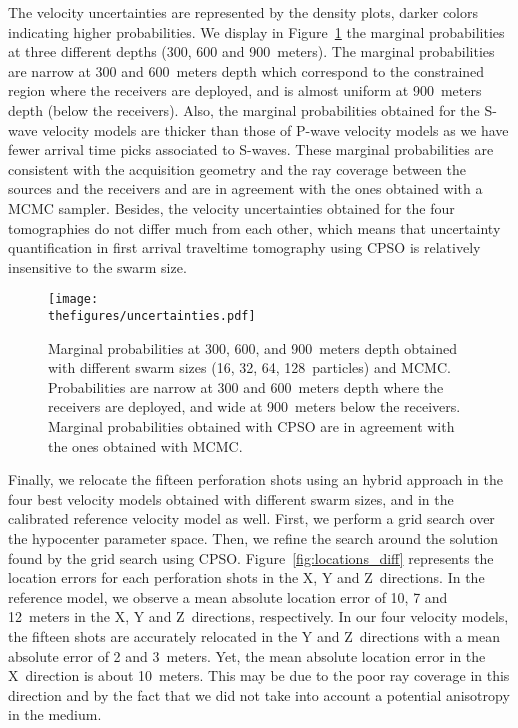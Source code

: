 The velocity uncertainties are represented by the density plots, darker colors indicating higher probabilities. We display in Figure~\ref{fig:uncertainties} the marginal probabilities at three different depths (300, 600 and 900~meters). The marginal probabilities are narrow at 300 and 600~meters depth which correspond to the constrained region where the receivers are deployed, and is almost uniform at 900~meters depth (below the receivers). Also, the marginal probabilities obtained for the S-wave velocity models are thicker than those of P-wave velocity models as we have fewer arrival time picks associated to S-waves. These marginal probabilities are consistent with the acquisition geometry and the ray coverage between the sources and the receivers and are in agreement with the ones obtained with a MCMC sampler. Besides, the velocity uncertainties obtained for the four tomographies do not differ much from each other, which means that uncertainty quantification in first arrival traveltime tomography using CPSO is relatively insensitive to the swarm size.

\begin{figure}[!htbp]
	\centering
	\texttt{[image: \\thefigures/uncertainties.pdf]}
	\caption{Marginal probabilities at 300, 600, and 900~meters depth obtained with different swarm sizes (16, 32, 64, 128~particles) and MCMC. Probabilities are narrow at 300 and 600~meters depth where the receivers are deployed, and wide at 900~meters below the receivers. Marginal probabilities obtained with CPSO are in agreement with the ones obtained with MCMC.}
	\label{fig:uncertainties}
\end{figure}

Finally, we relocate the fifteen perforation shots using an hybrid approach in the four best velocity models obtained with different swarm sizes, and in the calibrated reference velocity model as well. First, we perform a grid search over the hypocenter parameter space. Then, we refine the search around the solution found by the grid search using CPSO. Figure~\ref{fig:locations_diff} represents the location errors for each perforation shots in the X, Y and Z~directions. In the reference model, we observe a mean absolute location error of 10, 7 and 12~meters in the X, Y and Z~directions, respectively. In our four velocity models, the fifteen shots are accurately relocated in the Y and Z~directions with a mean absolute error of 2 and 3~meters. Yet, the mean absolute location error in the X~direction is about 10~meters. This may be due to the poor ray coverage in this direction and by the fact that we did not take into account a potential anisotropy in the medium.

